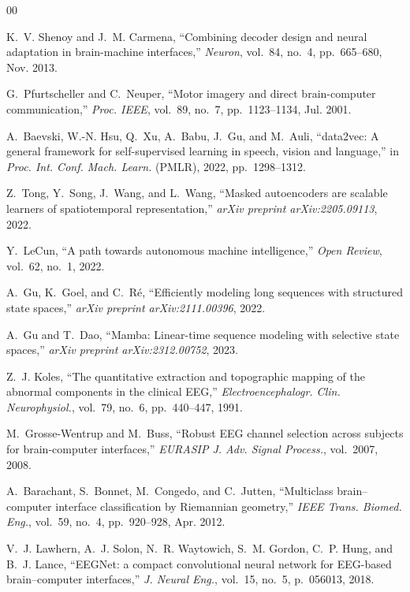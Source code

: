 \documentclass[journal]{IEEEtran}
\begin{document}
\begin{thebibliography}{00}
\sloppy

K.~V. Shenoy and J.~M. Carmena, ``Combining decoder design and neural adaptation in brain-machine interfaces,'' \emph{Neuron}, vol.~84, no.~4, pp.~665--680, Nov. 2013.

G.~Pfurtscheller and C.~Neuper, ``Motor imagery and direct brain-computer communication,'' \emph{Proc. IEEE}, vol.~89, no.~7, pp.~1123--1134, Jul. 2001.

A.~Baevski, W.-N. Hsu, Q.~Xu, A.~Babu, J.~Gu, and M.~Auli, ``data2vec: A general framework for self-supervised learning in speech, vision and language,'' in \emph{Proc. Int. Conf. Mach. Learn.} (PMLR), 2022, pp.~1298--1312.

Z.~Tong, Y.~Song, J.~Wang, and L.~Wang, ``Masked autoencoders are scalable learners of spatiotemporal representation,'' \emph{arXiv preprint arXiv:2205.09113}, 2022.

Y.~LeCun, ``A path towards autonomous machine intelligence,'' \emph{Open Review}, vol.~62, no.~1, 2022.

A.~Gu, K.~Goel, and C.~R\'{e}, ``Efficiently modeling long sequences with structured state spaces,'' \emph{arXiv preprint arXiv:2111.00396}, 2022.

A.~Gu and T.~Dao, ``Mamba: Linear-time sequence modeling with selective state spaces,'' \emph{arXiv preprint arXiv:2312.00752}, 2023.

Z.~J. Koles, ``The quantitative extraction and topographic mapping of the abnormal components in the clinical {EEG},'' \emph{Electroencephalogr. Clin. Neurophysiol.}, vol.~79, no.~6, pp.~440--447, 1991.

M.~Grosse-Wentrup and M.~Buss, ``Robust {EEG} channel selection across subjects for brain-computer interfaces,'' \emph{EURASIP J. Adv. Signal Process.}, vol.~2007, 2008.

A.~Barachant, S.~Bonnet, M.~Congedo, and C.~Jutten, ``Multiclass brain--computer interface classification by Riemannian geometry,'' \emph{IEEE Trans. Biomed. Eng.}, vol.~59, no.~4, pp.~920--928, Apr. 2012.

V.~J. Lawhern, A.~J. Solon, N.~R. Waytowich, S.~M. Gordon, C.~P. Hung, and B.~J. Lance, ``{EEGNet}: a compact convolutional neural network for {EEG}-based brain--computer interfaces,'' \emph{J. Neural Eng.}, vol.~15, no.~5, p.~056013, 2018.


\end{thebibliography}
\end{document}
